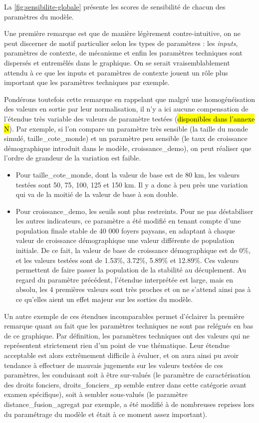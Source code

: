 La \cref{fig:sensibilite-globale} présente les \og scores de sensibilité\fg{} de chacun des paramètres du modèle.

Une première remarque est que de manière légèrement contre-intuitive, on ne peut discerner de motif particulier selon les types de paramètres : les \textit{inputs}, paramètres de contexte, de mécanisme et enfin les paramètres techniques sont dispersés et entremêlés dans le graphique.
On se serait vraisemblablement attendu à ce que les inputs et paramètres de contexte jouent un rôle plus important que les paramètres techniques par exemple.

Pondérons toutefois cette remarque en rappelant que malgré une homogénéisation des valeurs en sortie par leur normalisation, il n'y a ici aucune compensation de l'étendue très variable des valeurs de paramètre testées (\hl{disponibles dans l'annexe N}).
Par exemple, si l'on compare un paramètre très sensible (la taille du monde simulé, \textsf{taille\_cote\_monde}) et un paramètre peu sensible (le taux de croissance démographique introduit dans le modèle, \textsf{croissance\_demo}), on peut réaliser que l'ordre de grandeur de la variation est faible.
\begin{itemize}[noitemsep,nolistsep]\vspace*{-.5em}
	\item Pour \textsf{taille\_cote\_monde}, dont la valeur de base est de 80 km, les valeurs testées sont 50, 75, 100, 125 et 150 km.
	Il y a donc à peu près une variation qui va de la moitié de la valeur de base à son double.
	\item Pour \textsf{croissance\_demo}, les seuils sont plus restreints.
	Pour ne pas déstabiliser les autres indicateurs, ce paramètre a été modifié en tenant compte d'une population finale stable de 40 000 foyers paysans, en adaptant à chaque valeur de croissance démographique une valeur différente de population initiale.
	De ce fait, la valeur de base de croissance démographique est de 0\%, et les valeurs testées sont de 1.53\%, 3.72\%, 5.89\% et 12.89\%.
	Ces valeurs permettent de faire passer la population de la stabilité au décuplement. Au regard du paramètre précédent, l'étendue interprétée est large, mais en absolu, les 4 premières valeurs sont très proches et on ne s'attend ainsi pas à ce qu'elles aient un effet majeur sur les sorties du modèle.
\end{itemize}

Un autre exemple de ces étendues incomparables permet d'éclairer la première remarque quant au fait que les paramètres techniques ne sont pas relégués en bas de ce graphique.
Par définition, les paramètres techniques ont des valeurs qui ne représentent strictement rien d'un point de vue thématique.
Leur étendue acceptable est alors extrêmement difficile à évaluer, et on aura ainsi pu avoir tendance à effectuer de mauvais jugements sur les valeurs testées de ces paramètres, les conduisant soit à être sur-valués (le paramètre de caractérisation des droits fonciers, \textsf{droits\_fonciers\_zp} semble entrer dans cette catégorie avant examen spécifique), soit à sembler sous-valués (le paramètre \textsf{distance\_fusion\_agregat} par exemple, a été modifié à de nombreuses reprises lors du paramétrage du modèle et était à ce moment assez important).

